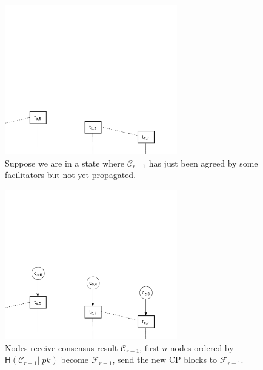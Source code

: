 \documentclass{beamer}
\newcommand{\C}{\mathcal{C}}
\newcommand{\F}{\mathcal{F}}
\begin{document}
\begin{frame}{\subsecname}
  \begin{figure}[h]
  \includegraphics[width=0.67\textwidth]{trustchain-1}
  \centering
  \caption{Suppose we are in a state where $\C_{r - 1}$ has just been agreed by some facilitators but not yet propagated.}
  \end{figure}
\end{frame}

\begin{frame}{\subsecname}
  \begin{figure}[h]
  \includegraphics[width=0.67\textwidth]{trustchain-2}
  \centering
  \caption{Nodes receive consensus result $\C_{r - 1}$,
    first $n$ nodes ordered by $\textsf{H}(\C_{r-1} || pk)$ become $\F_{r-1}$,
    send the new CP blocks to $\F_{r-1}$.}
  \end{figure}
\end{frame}
\end{document}

